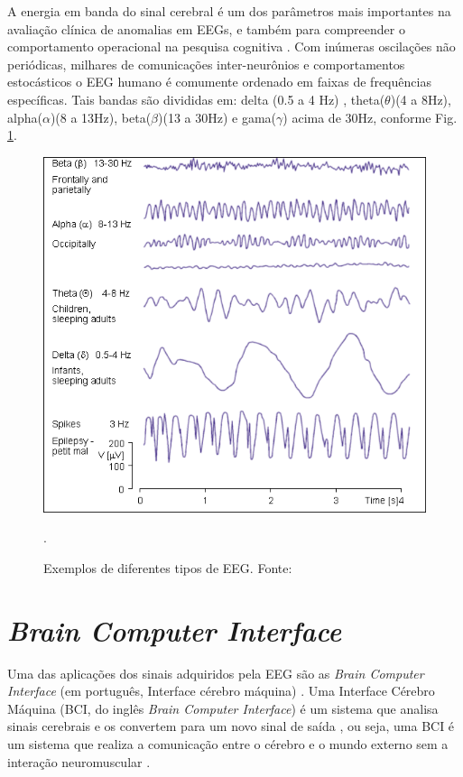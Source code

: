A energia em banda do sinal cerebral é um dos parâmetros mais importantes na avaliação clínica de anomalias em EEGs, e também para compreender o comportamento operacional na pesquisa cognitiva \cite{SIULYDissertacao}.
Com inúmeras oscilações não periódicas, milhares de comunicações inter-neurônios e comportamentos estocásticos o EEG humano é comumente ordenado em faixas de frequências específicas. Tais bandas são divididas em: delta
 (0.5 a 4 Hz) , theta($\theta$)(4 a 8Hz), alpha($\alpha$)(8 a 13Hz), beta($\beta$)(13 a 30Hz) e gama($\gamma$)  acima de 30Hz, conforme Fig. \ref{EEGcomun}.
 \newline

\begin{figure}[h]
	\centering
	\includegraphics[keepaspectratio=true,scale=0.75]{figuras/formas_EEG.PNG}
	\caption{Exemplos de diferentes tipos de EEG. Fonte: \cite{campisi2012eeg}}.
	\label{EEGcomun}
\end{figure}


\section{\textit{Brain Computer Interface}}

Uma das aplicações dos sinais adquiridos pela EEG são as \textit{Brain Computer Interface} (em português, Interface cérebro máquina) \cite{F.Lotte, SIULYDissertacao}. Uma Interface Cérebro Máquina (BCI, do inglês \textit{Brain Computer Interface}) é um sistema que analisa sinais cerebrais e os convertem para um novo sinal de saída \cite{BCIWolpaw}, ou seja, uma BCI é um sistema que realiza a comunicação entre o cérebro e o mundo externo sem a interação neuromuscular \cite{BCIWolpaw}.

